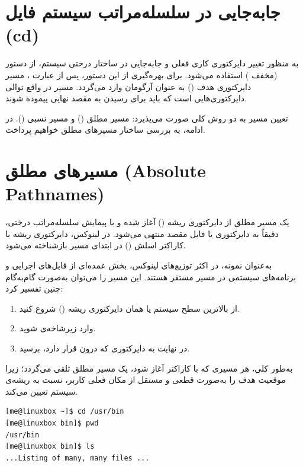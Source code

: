 \section{جابه‌جایی در سلسله‌مراتب سیستم فایل (cd)}

به منظور تغییر دایرکتوری کاری فعلی و جابه‌جایی در ساختار درختی سیستم، از دستور  (مخفف ) استفاده می‌شود. برای بهره‌گیری از این دستور، پس از عبارت ، مسیر دایرکتوری هدف () به عنوان آرگومان وارد می‌گردد. مسیر در واقع توالی دایرکتوری‌هایی است که باید برای رسیدن به مقصد نهایی پیموده شوند.

تعیین مسیر به دو روش کلی صورت می‌پذیرد: مسیر مطلق () و مسیر نسبی (). در ادامه، به بررسی ساختار مسیرهای مطلق خواهیم پرداخت.

\section{مسیرهای مطلق (Absolute Pathnames)}

یک مسیر مطلق از دایرکتوری ریشه () آغاز شده و با پیمایش سلسله‌مراتب درختی، دقیقاً به دایرکتوری یا فایل مقصد منتهی می‌شود. در لینوکس، دایرکتوری ریشه با کاراکتر اسلش (\cmd{/}) در ابتدای مسیر بازشناخته می‌شود.

به‌عنوان نمونه، در اکثر توزیع‌های لینوکس، بخش عمده‌ای از فایل‌های اجرایی و برنامه‌های سیستمی در مسیر  مستقر هستند. این مسیر را می‌توان به‌صورت گام‌به‌گام چنین تفسیر کرد:

\begin{enumerate}
  \item از بالاترین سطح سیستم یا همان دایرکتوری ریشه (\cmd{/}) شروع کنید.
  \item وارد زیرشاخه‌ی  شوید.
  \item در نهایت به دایرکتوری  که درون  قرار دارد، برسید.
\end{enumerate}

به‌طور کلی، هر مسیری که با کاراکتر \cmd{/} آغاز شود، یک مسیر مطلق تلقی می‌گردد؛ زیرا موقعیت هدف را به‌صورت قطعی و مستقل از مکان فعلی کاربر، نسبت به ریشه‌ی سیستم تعیین می‌کند.

\begin{latin}
\begin{lstlisting}
[me@linuxbox ~]$ cd /usr/bin
[me@linuxbox bin]$ pwd
/usr/bin
[me@linuxbox bin]$ ls
...Listing of many, many files ...
\end{lstlisting}
\end{latin}

